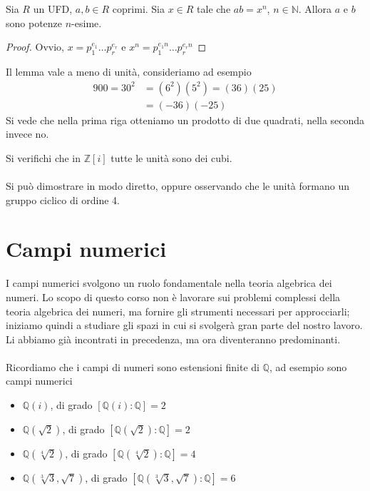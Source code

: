 \begin{lemma}
	Sia $R$ un UFD, $a,b\in R$ coprimi. Sia $x\in R$ tale che $ab=x^n$, $n\in\mathbb{N}$. Allora $a$ e $b$ sono potenze $n$-esime.
\end{lemma}
\begin{proof}
	Ovvio, $x=p_1^{e_1}\dots p_r^{e_r}$ e $x^n=p_1^{e_1n}\dots p_r^{e_rn}$
\end{proof}
\begin{osservazione}
	Il lemma vale a meno di unità, consideriamo ad esempio
	\begin{align*}
	900=30^2&=(6^2)(5^2)=(36)(25)\\
	&=(-36)(-25)
	\end{align*}
	Si vede che nella prima riga otteniamo un prodotto di due quadrati, nella seconda invece no.
\end{osservazione}
\begin{esercizio}
	Si verifichi che in $\mathbb{Z}[i]$ tutte le unità sono dei cubi. \\ \\ Si può dimostrare in modo diretto, oppure osservando che le unità formano un gruppo ciclico di ordine 4.
\end{esercizio}




\chapter{Campi numerici}
I campi numerici svolgono un ruolo fondamentale nella teoria algebrica dei numeri. Lo scopo di questo corso non è lavorare sui problemi complessi della teoria algebrica dei numeri, ma fornire gli strumenti necessari per approcciarli; iniziamo quindi a studiare gli spazi in cui si svolgerà gran parte del nostro lavoro. Li abbiamo già incontrati in precedenza, ma ora diventeranno predominanti. \\ \\
Ricordiamo che i campi di numeri sono estensioni finite di $\mathbb{Q}$, ad esempio sono campi numerici
\begin{itemize}
	\item $\mathbb{Q}(i)$, di grado $[\mathbb{Q}(i):\mathbb{Q}]=2$
	\item $\mathbb{Q}(\sqrt{2})$, di grado $[\mathbb{Q}(\sqrt{2}):\mathbb{Q}]=2$
	\item $\mathbb{Q}(\sqrt[4]{2})$, di grado $[\mathbb{Q}(\sqrt[4]{2}):\mathbb{Q}]=4$
	\item $\mathbb{Q}(\sqrt[3]{3},\sqrt{7})$, di grado $[\mathbb{Q}(\sqrt[3]{3},\sqrt{7}):\mathbb{Q}]=6$
\end{itemize}





